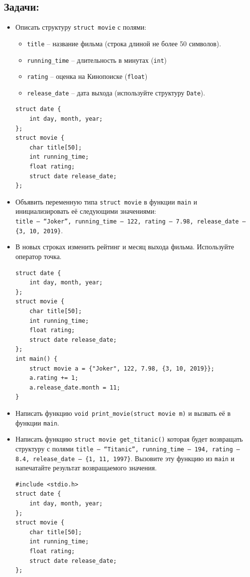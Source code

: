 \documentclass{article}
\begin{document}
\subsection*{Задачи:}
\begin{itemize}

\item Описать структуру \texttt{struct movie} с полями: 
\begin{itemize}
\item \texttt{title} -- название фильма (строка длиной не более 50 символов).
\item \texttt{running\_time} -- длительность в минутах (\texttt{int})
\item \texttt{rating} -- оценка на Кинопоиске (\texttt{float})
\item \texttt{release\_date} -- дата выхода (используйте структуру \texttt{Date}).
\end{itemize}

\begin{lstlisting}[backgroundcolor = \color{solcolor}]
struct date {
    int day, month, year;
};
struct movie {
    char title[50];
    int running_time;
    float rating;
    struct date release_date;
};
\end{lstlisting}
\item Объявить переменную типа \texttt{struct movie} в функции \texttt{main} и инициализировать её следующими значениями:\\
\texttt{title -- ``Joker'', running\_time -- 122, rating -- 7.98, release\_date -- \{3, 10, 2019\}}.

\item В новых строках изменить рейтинг и месяц выхода фильма. Используйте оператор точка.
\begin{lstlisting}[backgroundcolor = \color{solcolor}]
struct date {
    int day, month, year;
};
struct movie {
    char title[50];
    int running_time;
    float rating;
    struct date release_date;
};
int main() {
    struct movie a = {"Joker", 122, 7.98, {3, 10, 2019}};
    a.rating += 1;
    a.release_date.month = 11;
}
\end{lstlisting}
\item Написать функцию \texttt{void print\_movie(struct movie m)} и вызвать её в функции \texttt{main}.
\item Написать функцию \texttt{struct movie get\_titanic()} которая будет возвращать структуру с полями \texttt{title -- ``Titanic'',  running\_time -- 194, rating -- 8.4, release\_date -- \{1, 11, 1997\}}. Вызовите эту функцию из \texttt{main} и напечатайте результат возвращаемого значения.
\begin{lstlisting}[backgroundcolor = \color{solcolor}]
#include <stdio.h>
struct date {
    int day, month, year;
};
struct movie {
    char title[50];
    int running_time;
    float rating;
    struct date release_date;
};


\end{lstlisting}
\end{itemize}
\end{document}
